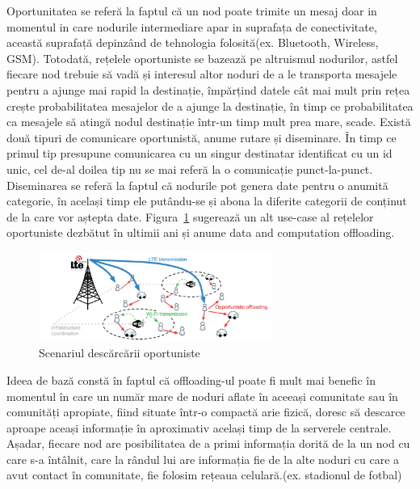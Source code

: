 \documentclass[12pt,a4paper]{report}
\begin{document}
Oportunitatea se referă la faptul că un nod poate trimite un mesaj doar in momentul in care nodurile intermediare apar in suprafața de conectivitate, această suprafață depinzând de tehnologia folosită(ex. Bluetooth, Wireless, GSM).  Totodată, rețelele oportuniste se bazează pe altruismul nodurilor, astfel fiecare nod trebuie să vadă și interesul altor noduri de a le transporta mesajele pentru a ajunge mai rapid la destinație, împărțind datele cât mai mult prin rețea crește probabilitatea mesajelor de a ajunge la destinație, în timp ce probabilitatea ca mesajele să atingă nodul destinație într-un timp mult prea mare, scade. Există două tipuri de comunicare oportunistă, anume rutare și diseminare. În timp ce primul tip presupune comunicarea cu un singur destinatar identificat cu un id unic, cel de-al doilea tip nu se mai referă la o comunicație punct-la-punct. Diseminarea se referă la faptul că nodurile pot genera date pentru o anumită categorie, în același timp ele putându-se și abona la diferite categorii de conținut de la care vor aștepta date. 
Figura~\ref{fig:pic1} sugerează un alt use-case al rețelelor oportuniste dezbătut în ultimii ani și anume data and computation offloading.
\begin{figure}[th]
\centering
\includegraphics[width=3in]{pics/ONs.png}
  \caption{Scenariul descărcării oportuniste}
  \label{fig:pic1}
\end{figure}
Ideea de bază constă în faptul că offloading-ul poate fi mult mai benefic în momentul în care un număr mare de noduri aflate în aceeași comunitate sau în comunități apropiate, fiind situate într-o compactă arie fizică, doresc să descarce aproape aceași informație în aproximativ același timp de la serverele centrale. Așadar, fiecare nod are posibilitatea de a primi informația dorită de la un nod cu care s-a întâlnit, care la rândul lui are informația fie de la alte noduri cu care a avut contact în comunitate, fie folosim rețeaua celulară.(ex. stadionul de fotbal)
\end{document}
